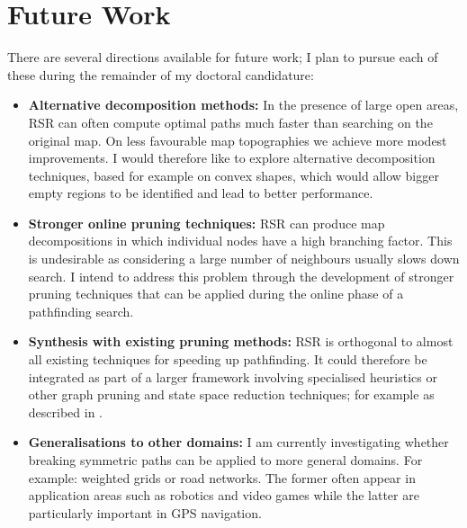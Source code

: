 \section{Future Work}
\label{sec:futurework}
There are several directions available for future work; I plan to pursue each
of these during the remainder of my doctoral candidature:
\begin{itemize}
\item{\textbf{Alternative decomposition methods:} In the presence of large open 
areas, RSR can often compute optimal paths much faster than searching on the original
map. On less favourable map topographies we achieve more modest improvements.
I would therefore like to explore alternative decomposition techniques, based
for example on convex shapes, which would allow bigger empty regions to be
identified and lead to better performance.}
\item{\textbf{Stronger online pruning techniques:} RSR can produce map decompositions 
in which individual nodes have a high branching factor. This is undesirable as 
considering a large number of neighbours
usually slows down search. I intend to address  
this problem through the development of stronger pruning techniques 
that can be applied during the online phase of a pathfinding search.}
\item{\textbf{Synthesis with existing pruning methods:} RSR is orthogonal to almost
all existing techniques for speeding up pathfinding. It could therefore be
integrated as part of a larger framework involving specialised heuristics or
other graph pruning and state space reduction techniques; for example as
described in \cite{botea04,bjornsson06,pochter10}.}
\item{\textbf{Generalisations to other domains:} I am currently investigating
whether breaking symmetric paths can be applied to more general domains. For
example: weighted grids or road networks. The former often appear in application
areas such as robotics and video games while the latter are particularly
important in GPS navigation.
}
\end{itemize}
